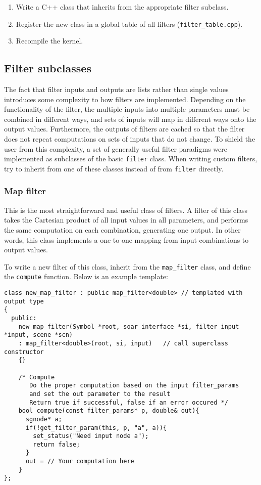 \begin{enumerate}
\item Write a C++ class that inherits from the appropriate filter subclass.
\item Register the new class in a global table of all filters (\texttt{filter\_table.cpp}).
\item Recompile the kernel. 
\end{enumerate}

\subsection{Filter subclasses}

The fact that filter inputs and outputs are lists rather than single values introduces some complexity to how filters are implemented.
Depending on the functionality of the filter, the multiple inputs into multiple parameters must be combined in different ways, and sets of inputs will map in different ways onto the output values.
Furthermore, the outputs of filters are cached so that the filter does not repeat computations on sets of inputs that do not change.
To shield the user from this complexity, a set of generally useful filter paradigms were implemented as subclasses of the basic \texttt{filter} class.
When writing custom filters, try to inherit from one of these classes instead of from \texttt{filter} directly.

\subsubsection{Map filter}
This is the most straightforward and useful class of filters.
A filter of this class takes the Cartesian product of all input values in all parameters,
and performs the same computation on each combination, generating one output.
In other words, this class implements a one-to-one mapping from input combinations to output values.

To write a new filter of this class, inherit from the \texttt{map\_filter} class, 
and define the \texttt{compute} function. Below is an example template:

\begin{verbatim}
class new_map_filter : public map_filter<double> // templated with output type
{
  public:
    new_map_filter(Symbol *root, soar_interface *si, filter_input *input, scene *scn)
    : map_filter<double>(root, si, input)   // call superclass constructor
    {}

    /* Compute
       Do the proper computation based on the input filter_params 
       and set the out parameter to the result 
       Return true if successful, false if an error occured */
    bool compute(const filter_params* p, double& out){
      sgnode* a;
      if(!get_filter_param(this, p, "a", a)){
        set_status("Need input node a");
        return false;
      }
      out = // Your computation here
    }
};
\end{verbatim}

